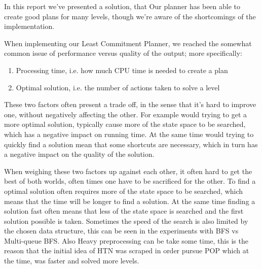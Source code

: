 \documentclass[Main]{subfiles}
\begin{document}
In this report we've presented a solution, that 
Our planner has been able to create good plans for many levels, though we're aware of the shortcomings of the implementation.




When implementing our Least Commitment Planner, we reached the somewhat common issue of performance versus quality of the output; more specifically:

\begin{enumerate}
	\item Processing time, i.e. how much CPU time is needed to create a plan
	\item Optimal solution, i.e. the number of actions taken to solve a level
\end{enumerate}

These two factors often present a trade off, in the sense that it's hard to improve one, without negatively affecting the other. 
For example would trying to get a more optimal solution, typically cause more of the state space to be searched, which has a negative impact on running time.
At the same time would trying to quickly find a solution mean that some shortcuts are necessary, which in turn has a negative impact on the quality of the solution.

When weighing these two factors up against each other, it often hard to get the best of both worlds, often times one have to be sacrificed for the other. To find a optimal solution often requires more of the state space to be searched, which means that the time will be longer to find a solution. At the same time finding a solution fast often means that less of the state space is searched and the first solution possible is taken.
Sometimes the speed of the search is also limited by the chosen data structure, this can be seen in the experiments with BFS vs Multi-queue BFS. Also Heavy preprocessing can be take some time, this is the reason that the initial idea of HTN was scraped in order pursue POP which at the time, was faster and solved more levels.
\end{document}
